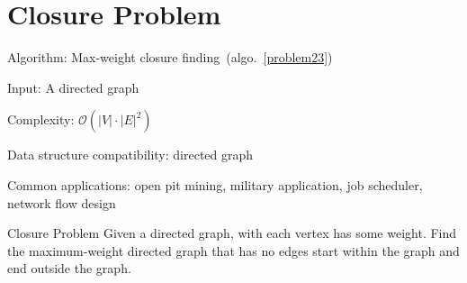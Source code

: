 \documentclass{article}
\begin{document}
\fi

%
%

\def\pbname{Closure Problem} %

\section{\pbname} 

\begin{overview}
\item [Algorithm:] Max-weight closure finding~(algo.~\ref{problem23}) 
\item [Input:] A directed graph 
\item [Complexity:]$\mathcal{O}(|V|\cdot |E|^2)$
\item [Data structure compatibility:] directed graph
\item [Common applications:] open pit mining, military application, job scheduler, network flow design
\end{overview}



\begin{problem}{\pbname}
	Given a directed graph, with each vertex has some weight. Find the maximum-weight directed graph that has no edges start within the graph and end outside the graph.
\end{problem}
\end{document}
